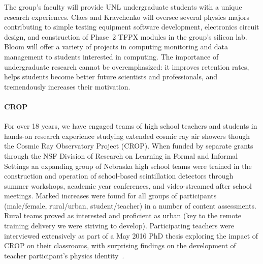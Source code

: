 
\noindent

The group's faculty will provide UNL undergraduate students with a unique research experiences. Claes and Kravchenko will oversee several physics majors contributing to simple testing equipment software development, electronics circuit design, and construction of Phase~2 TFPX modules in the group's silicon lab.
Bloom will offer a variety of projects in computing monitoring and data management to students interested in computing.
The importance of undergraduate research cannot be overemphasized: it improves retention rates, helps students become better future 
scientists and professionals, and tremendously increases their motivation.

\paragraph{CROP}
For over 18 years, we have engaged teams of high school teachers and students in hands-on research experience studying extended cosmic ray air showers though the Cosmic Ray Observatory Project (CROP). When funded by separate grants through the NSF Division of Research on Learning in Formal and Informal Settings an expanding group of Nebraska high school teams were trained in the construction and operation of school-based scintillation detectors through summer workshops, academic year conferences, and video-streamed after school meetings. Marked increases were found for all groups of participants (male/female, rural/urban, student/teacher) in a number of content assessments. Rural teams proved as interested and proficient as urban (key to the remote training delivery we were striving to develop). Participating teachers were interviewed extensively as part of a May 2016 PhD thesis exploring the impact of CROP on their classrooms, with surprising findings on the development of teacher participant’s physics identity~\cite{bib:teacherdevelopment}.

